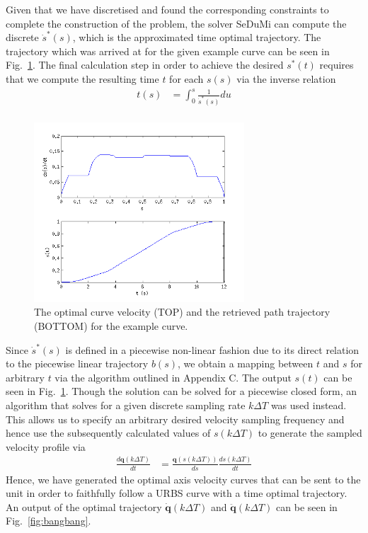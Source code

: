 Given that we have discretised and found the corresponding constraints to complete the construction of the problem, the solver SeDuMi can compute the discrete $\dot{s}^*(s)$, which is the approximated time optimal trajectory. The trajectory which was arrived at for the given example curve can be seen in Fig.~\ref{fig:sdot_st}.
The final calculation step in order to achieve the desired $s^*(t)$ requires that we compute the resulting time $t$ for each $s(s)$ via the inverse relation
\begin{align*}
t(s) &= \int_0^s\frac{1}{\dot{s}^*(s)}du\\ 
\end{align*}

\begin{figure}[htbp]
\centering
\includegraphics[width=0.7\textwidth]{figures/optimisation/sdot_st.png}
\caption[$\dot{s}^*(s)$ and $s^*(t)$]{
The optimal curve velocity (TOP) and the retrieved path trajectory (BOTTOM) for the example curve.
\label{fig:sdot_st}}
\end{figure}

Since $\dot{s}^*(s)$ is defined in a piecewise non-linear fashion due to its direct relation to the piecewise linear trajectory $b(s)$, we obtain a mapping between $t$ and $s$ for arbitrary $t$ via the algorithm outlined in Appendix C. The output $s(t)$ can be seen in Fig.~\ref{fig:sdot_st}. Though the solution can be solved for a piecewise closed form, an algorithm that solves for a given discrete sampling rate $k\Delta T$ was used instead. This allows us to specify an arbitrary desired velocity sampling frequency and hence use the subsequently calculated values of $s(k\Delta T)$ to generate the sampled velocity profile via 
\begin{align*}
\frac{d\textbf{q}\left(k \Delta T\right)}{dt} &= \frac{\textbf{q}\left(s(k\Delta T)\right)}{ds}\frac{ds(k\Delta T)}{dt}
\end{align*}
Hence, we have generated the optimal axis velocity curves that can be sent to the unit in order to faithfully follow a URBS curve with a time optimal trajectory.
An output of the optimal trajectory $\dot{\textbf{q}}(k\Delta T)$ and $\ddot{\textbf{q}}(k\Delta T)$ can be seen in Fig.~\ref{fig:bangbang}.


